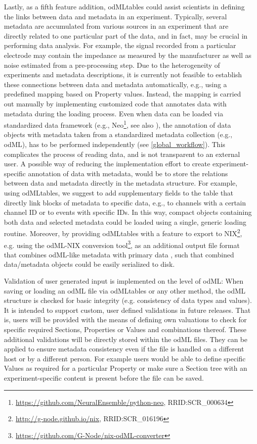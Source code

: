 Lastly, as a fifth feature addition, odMLtables could assist scientists in defining the links between data and metadata in an experiment. Typically, several metadata are accumulated from various sources in an experiment that are directly related to one particular part of the data, and in fact, may be crucial in performing data analysis. For example, the signal recorded from a particular electrode may contain the impedance as measured by the manufacturer as well as noise estimated from a pre-processing step. Due to the heterogeneity of experiments and metadata descriptions, it is currently not feasible to establish these connections between data and metadata automatically, e.g., using a predefined mapping based on Property values. Instead, the mapping is carried out manually by implementing customized code that annotates data with metadata during the loading process. Even when data can be loaded via standardized data framework (e.g., Neo\footnote{\url{https://github.com/NeuralEnsemble/python-neo}, RRID:SCR\_000634}, see also \citealp{Garcia14_10}), the annotation of data objects with metadata taken from a standardized metadata collection (e.g., odML), has to be performed independently (see \cref{global_workflow}). This complicates the process of reading data, and is not transparent to an external user. A possible way of reducing the implementation effort to create experiment-specific annotation of data with metadata, would be to store the relations between data and metadata directly in the metadata structure. For example, using odMLtables, we suggest to add supplementary fields to the table that directly link blocks of metadata to specific data, e.g., to channels with a certain channel ID or to events with specific IDs. In this way, compact objects containing both data and selected metadata could be loaded using a single, generic loading routine. Moreover, by providing odMLtables with a feature to export to NIX\footnote{\url{http://g-node.github.io/nix}, RRID:SCR\_016196}, e.g. using the odML-NIX conversion tool\footnote{\url{https://github.com/G-Node/nix-odML-converter}}, as an additional output file format that combines odML-like metadata with primary data \citep{Adrian14}, such that combined data/metadata objects could be easily serialized to disk.

Validation of user generated input is implemented on the level of odML: When saving or loading an odML file via odMLtables or any other method, the odML structure is checked for basic integrity (e.g. consistency of data types and values). It is intended to support custom, user defined validations in future releases. That is, users will be provided with the means of defining own valuations to check for specific required Sections, Properties or Values and combinations thereof. These additional validations will be directly stored within the odML files. They can be applied to ensure metadata consistency even if the file is handled on a different host or by a different person.
For example users would be able to define specific Values as required for a particular Property or make sure a Section tree with an experiment-specific content is present before the file can be saved.

